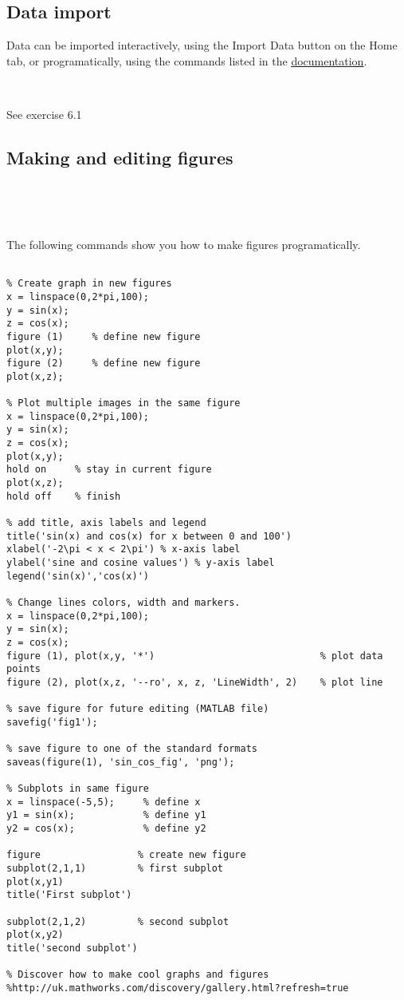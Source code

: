 \documentclass[11pt]{amsart}
\begin{document}
\subsection{Data import}

Data can be imported interactively, using the Import Data button on the Home tab, or programatically, using the commands listed in the \href{http://uk.mathworks.com/help/matlab/import_export/supported-file-formats.html?refresh=true}{\underline{documentation}}.

\

See exercise 6.1

\subsection{Making and editing figures}

\

\


The following commands show you how to make figures programatically. 

\color{blue}
\begin{verbatim}

% Create graph in new figures
x = linspace(0,2*pi,100);
y = sin(x);
z = cos(x);
figure (1)     % define new figure
plot(x,y);
figure (2)     % define new figure 
plot(x,z);

% Plot multiple images in the same figure
x = linspace(0,2*pi,100);
y = sin(x);
z = cos(x);
plot(x,y);
hold on     % stay in current figure		
plot(x,z);
hold off    % finish 

% add title, axis labels and legend
title('sin(x) and cos(x) for x between 0 and 100')
xlabel('-2\pi < x < 2\pi') % x-axis label
ylabel('sine and cosine values') % y-axis label
legend('sin(x)','cos(x)')

% Change lines colors, width and markers.
x = linspace(0,2*pi,100);
y = sin(x);
z = cos(x);
figure (1), plot(x,y, '*')                             % plot data points
figure (2), plot(x,z, '--ro', x, z, 'LineWidth', 2)    % plot line

% save figure for future editing (MATLAB file)
savefig('fig1');

% save figure to one of the standard formats
saveas(figure(1), 'sin_cos_fig', 'png');

% Subplots in same figure
x = linspace(-5,5);     % define x
y1 = sin(x);            % define y1
y2 = cos(x);            % define y2

figure                 % create new figure
subplot(2,1,1)         % first subplot
plot(x,y1)
title('First subplot')

subplot(2,1,2)         % second subplot
plot(x,y2)
title('second subplot')

% Discover how to make cool graphs and figures
%http://uk.mathworks.com/discovery/gallery.html?refresh=true
\end{verbatim}
\color{black}
\end{document}
